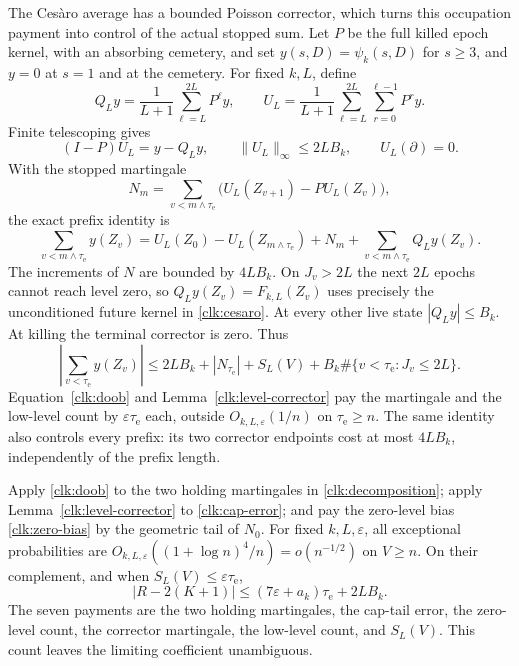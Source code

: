 \documentclass[11pt]{amsart}
\theoremstyle{definition}
\theoremstyle{remark}
\begin{document}
The Ces\`aro average has a bounded Poisson corrector, which turns this
occupation payment into control of the actual stopped sum. Let $P$ be
the full killed epoch kernel, with an absorbing cemetery, and set
$y(s,D)=\psi_k(s,D)$ for $s\ge3$, and $y=0$ at $s=1$ and at the
cemetery. For fixed
$k,L$, define
\begin{equation}\label{clk:cesaro-corrector}
 Q_Ly=\frac1{L+1}\sum_{\ell=L}^{2L}P^\ell y,\qquad
 U_L=\frac1{L+1}\sum_{\ell=L}^{2L}\sum_{r=0}^{\ell-1}P^r y.
\end{equation}
Finite telescoping gives
\[
 (I-P)U_L=y-Q_Ly,\qquad
 \|U_L\|_\infty\le2LB_k,\qquad U_L(\partial)=0.
\]
With the stopped martingale
\[
 N_m=\sum_{v<m\wedge\tau_{\mathrm e}}
       \bigl(U_L(Z_{v+1})-PU_L(Z_v)\bigr),
\]
the exact prefix identity is
\begin{equation}\label{clk:corrector-prefix}
 \sum_{v<m\wedge\tau_{\mathrm e}}y(Z_v)
 =U_L(Z_0)-U_L(Z_{m\wedge\tau_{\mathrm e}})+N_m
                 +\sum_{v<m\wedge\tau_{\mathrm e}}Q_Ly(Z_v).
\end{equation}
The increments of $N$ are bounded by $4LB_k$. On $J_v>2L$ the next
$2L$ epochs cannot reach level zero, so $Q_Ly(Z_v)=F_{k,L}(Z_v)$
uses precisely the unconditioned future kernel in \eqref{clk:cesaro}.
At every other live state $|Q_Ly|\le B_k$. At killing the terminal
corrector is zero. Thus
\begin{equation}\label{clk:lag-boundary}
 \left|\sum_{v<\tau_{\mathrm e}}y(Z_v)\right|
 \le2LB_k+|N_{\tau_{\mathrm e}}|+S_L(V)
                  +B_k\#\{v<\tau_{\mathrm e}:J_v\le2L\}.
\end{equation}
Equation~\eqref{clk:doob} and Lemma~\ref{clk:level-corrector} pay
the martingale and the low-level count by $\varepsilon\tau_{\mathrm e}$
each, outside $O_{k,L,\varepsilon}(1/n)$ on $\tau_{\mathrm e}\ge n$.
The same identity also controls every prefix: its two corrector
endpoints cost at most $4LB_k$, independently of the prefix length.

Apply \eqref{clk:doob} to the two holding martingales in
\eqref{clk:decomposition}; apply Lemma~\ref{clk:level-corrector}
to \eqref{clk:cap-error}; and pay the zero-level bias
\eqref{clk:zero-bias} by the geometric tail of $N_0$. For fixed
$k,L,\varepsilon$, all exceptional probabilities are
$O_{k,L,\varepsilon}((1+\log n)^4/n)=o(n^{-1/2})$ on $V\ge n$.
On their complement, and when $S_L(V)\le\varepsilon \tau_{\mathrm e}$,
\begin{equation}\label{clk:clock-error}
 |R-2(K+1)|\le(7\varepsilon+a_k)\tau_{\mathrm e}+2L B_k.
\end{equation}
The seven payments are the two holding martingales, the cap-tail error,
the zero-level count, the corrector martingale, the low-level count, and
$S_L(V)$. This count leaves the limiting coefficient unambiguous.
\end{document}
